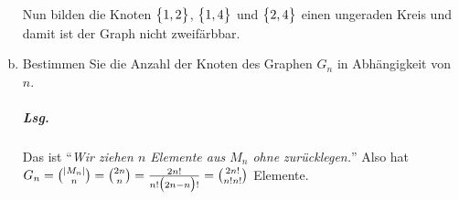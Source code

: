 \documentclass{scrreprt}
\begin{document}
\begin{enumerate}[(a)]
\begin{minipage}{.45\textwidth}
  \end{minipage}

  Nun bilden die Knoten $\qty\big{1, 2}$, $\qty\big{1, 4}$ und $\qty\big{2, 4}$
  einen ungeraden Kreis und damit ist der Graph nicht zweifärbbar.

\newpage
\item Bestimmen Sie die Anzahl der Knoten des Graphen $G_n$ in Abhängigkeit von $n$.

  \subparagraph{Lsg.} Das ist
  ``\emph{Wir ziehen $n$ Elemente aus $M_n$ ohne zurücklegen.}''
  Also hat $G_n = \binom{\abs{M_n}}{n} = \binom{2n}{n}
  = \frac{2n!}{n!\qty\big(2n - n)!} = \binom{2n!}{n!n!}$ Elemente.
\end{enumerate}
\end{document}
